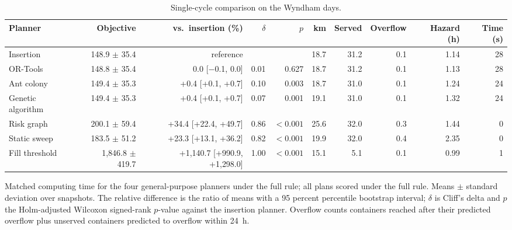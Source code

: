 \begin{table}[!htbp]
\caption{Single-cycle comparison on the Wyndham days.}
\label{tab:wyndham}
\centering
\footnotesize
\setlength{\tabcolsep}{3pt}
\begin{tabular}{lrrrrrrrrr}
\toprule
Planner & Objective & vs.\ insertion (\%) & $\delta$ & $p$ & km & Served & Overflow & Hazard (h) & Time (s) \\
\midrule
Insertion & 148.9 $\pm$ 35.4 & reference &  &  & 18.7 & 31.2 & 0.1 & 1.14 & 28 \\
OR-Tools & 148.8 $\pm$ 35.4 & 0.0 [\ensuremath{-}0.1, 0.0] & 0.01 & 0.627 & 18.7 & 31.2 & 0.1 & 1.13 & 28 \\
Ant colony & 149.4 $\pm$ 35.3 & +0.4 [+0.1, +0.7] & 0.10 & 0.003 & 18.7 & 31.0 & 0.1 & 1.24 & 24 \\
Genetic algorithm & 149.4 $\pm$ 35.3 & +0.4 [+0.1, +0.7] & 0.07 & 0.001 & 19.1 & 31.0 & 0.1 & 1.32 & 24 \\
Risk graph & 200.1 $\pm$ 59.4 & +34.4 [+22.4, +49.7] & 0.86 & $<0.001$ & 25.6 & 32.0 & 0.3 & 1.44 & 0 \\
Static sweep & 183.5 $\pm$ 51.2 & +23.3 [+13.1, +36.2] & 0.82 & $<0.001$ & 19.9 & 32.0 & 0.4 & 2.35 & 0 \\
Fill threshold & 1{,}846.8 $\pm$ 419.7 & +1{,}140.7 [+990.9, +1{,}298.0] & 1.00 & $<0.001$ & 15.1 & 5.1 & 0.1 & 0.99 & 1 \\
\bottomrule
\end{tabular}
\par\smallskip\footnotesize Matched computing time for the four general-purpose planners under the full rule; all plans scored under the full rule. Means $\pm$ standard deviation over snapshots. The relative difference is the ratio of means with a 95 percent percentile bootstrap interval; $\delta$ is Cliff's delta and $p$ the Holm-adjusted Wilcoxon signed-rank $p$-value against the insertion planner. Overflow counts containers reached after their predicted overflow plus unserved containers predicted to overflow within 24~h.
\end{table}
